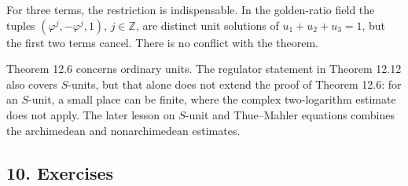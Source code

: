 \documentclass[
  11pt,
  a4paper,
]{article}
\begin{document}
For three terms, the restriction is indispensable. In the golden-ratio
field the tuples \((\varphi^j,-\varphi^j,1)\), \(j\in\mathbb Z\), are
distinct unit solutions of \(u_1+u_2+u_3=1\), but the first two terms
cancel. There is no conflict with the theorem.

Theorem 12.6 concerns ordinary units. The regulator statement in Theorem
12.12 also covers \(S\)-units, but that alone does not extend the proof
of Theorem 12.6: for an \(S\)-unit, a small place can be finite, where
the complex two-logarithm estimate does not apply. The later lesson on
\(S\)-unit and Thue--Mahler equations combines the archimedean and
nonarchimedean estimates.

\subsection{10. Exercises}\label{exercises}
\end{document}
